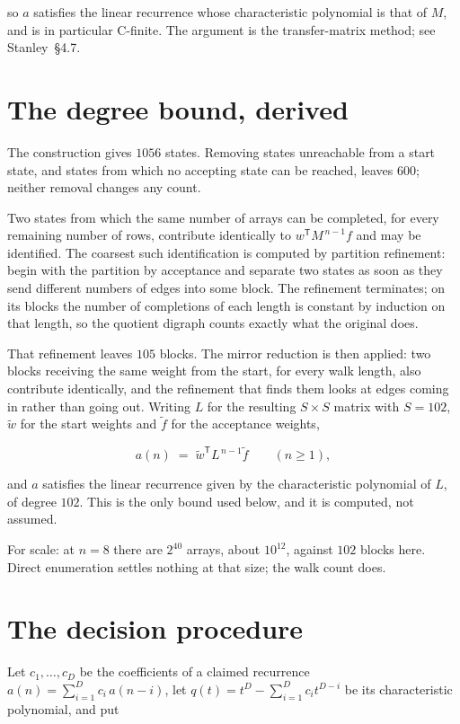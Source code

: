 \documentclass[11pt]{article}
\theoremstyle{definition}
\begin{document}
so $a$ satisfies the linear recurrence whose characteristic polynomial is that of $M$, and is in particular C-finite. The argument is the transfer-matrix method; see Stanley~\S4.7.

\section{The degree bound, derived}

The construction gives $1056$ states. Removing states unreachable from a start state, and states from which no accepting state can be reached, leaves $600$; neither removal changes any count.

Two states from which the same number of arrays can be completed, for every remaining number of rows, contribute identically to $w^{\mathsf T}M^{\,n-1}f$ and may be identified. The coarsest such identification is computed by partition refinement: begin with the partition by acceptance and separate two states as soon as they send different numbers of edges into some block. The refinement terminates; on its blocks the number of completions of each length is constant by induction on that length, so the quotient digraph counts exactly what the original does.

That refinement leaves $105$ blocks. The mirror reduction is then applied: two blocks receiving the same weight from the start, for every walk length, also contribute identically, and the refinement that finds them looks at edges coming in rather than going out. Writing $L$ for the resulting $S \times S$ matrix with $S = 102$, $\tilde w$ for the start weights and $\tilde f$ for the acceptance weights,

\[a(n) \;=\; \tilde w^{\mathsf T} L^{\,n-1} \tilde f \qquad (n \ge 1),\]

and $a$ satisfies the linear recurrence given by the characteristic polynomial of $L$, of degree $102$. This is the only bound used below, and it is computed, not assumed.

For scale: at $n = 8$ there are $2^{40}$ arrays, about $10^{12}$, against $102$ blocks here. Direct enumeration settles nothing at that size; the walk count does.

\section{The decision procedure}

Let $c_1,\dots,c_D$ be the coefficients of a claimed recurrence $a(n) = \sum_{i=1}^{D} c_i\,a(n-i)$, let $q(t) = t^{D} - \sum_{i=1}^{D} c_i t^{D-i}$ be its characteristic polynomial, and put
\end{document}
